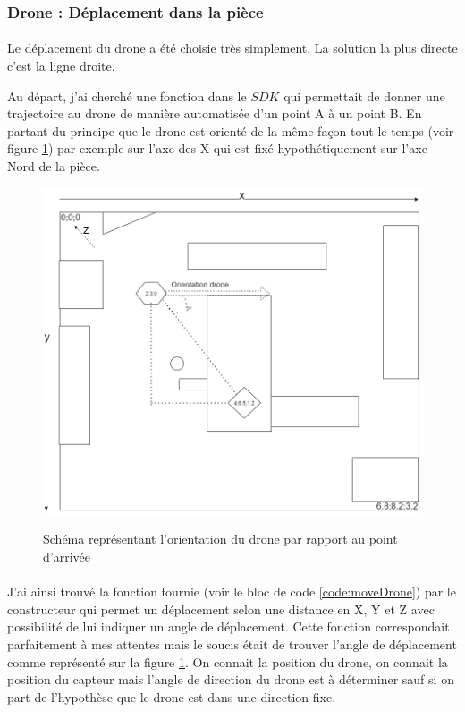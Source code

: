     \subsubsection{Drone : Déplacement dans la pièce}
        \paragraph*{}
        Le déplacement du drone a été choisie très simplement. La solution la plus directe c'est la ligne droite.
        
        Au départ, j'ai cherché une fonction dans le $SDK$ qui permettait de donner une trajectoire au drone de manière automatisée d'un point A à un point B. En partant du principe que le drone est orienté de la même façon tout le temps (voir figure \ref{fig:methodologie}) par exemple sur l'axe des X qui est fixé hypothétiquement sur l'axe Nord de la pièce.
        
        
        \begin{figure}[H]
            \centering
        	\begin{frame}{\includegraphics[width=1\textwidth]{image/methodologie.png}}
        	\end{frame}
        	\caption{\label{fig:methodologie}Schéma représentant l'orientation du drone par rapport au point d'arrivée}
        \end{figure}
        
        \paragraph*{}
        J'ai ainsi trouvé la fonction fournie (voir le bloc de code \ref{code:moveDrone}) par le constructeur qui permet un déplacement selon une distance en X, Y et Z avec possibilité de lui indiquer un angle de déplacement. Cette fonction correspondait parfaitement à mes attentes mais le soucis était de trouver l'angle de déplacement comme représenté sur la figure \ref{fig:methodologie}. On connait la position du drone, on connait la position du capteur mais l'angle de direction du drone est à déterminer sauf si on part de l'hypothèse que le drone est dans une direction fixe.
        
